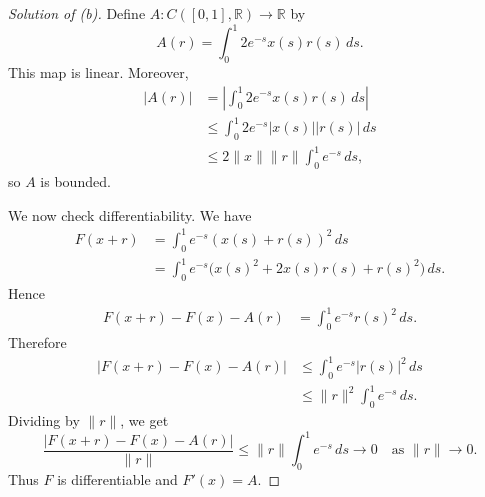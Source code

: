 \begin{proof}[Solution of (b)]
    Define $A : C([0,1], \mathbb R) \to \mathbb R$ by
    \[
        A(r) = \int_0^1 2e^{-s}x(s)r(s)\, ds.
    \]
    This map is linear. Moreover,
    \begin{align*}
        |A(r)|
        &= \left|\int_0^1 2e^{-s}x(s)r(s)\, ds\right| \\
        &\le \int_0^1 2e^{-s}|x(s)||r(s)|\, ds \\
        &\le 2 \|x\| \|r\| \int_0^1 e^{-s}\, ds,
    \end{align*}
    so $A$ is bounded.

    We now check differentiability. We have
    \begin{align*}
        F(x+r)
        &= \int_0^1 e^{-s}(x(s)+r(s))^2\, ds \\
        &= \int_0^1 e^{-s}\big(x(s)^2 + 2x(s)r(s) + r(s)^2\big)\, ds.
    \end{align*}
    Hence
    \begin{align*}
        F(x+r) - F(x) - A(r)
        &= \int_0^1 e^{-s}r(s)^2\, ds.
    \end{align*}
    Therefore
    \begin{align*}
        |F(x+r) - F(x) - A(r)|
        &\le \int_0^1 e^{-s}|r(s)|^2\, ds \\
        &\le \|r\|^2 \int_0^1 e^{-s}\, ds.
    \end{align*}
    Dividing by $\|r\|$, we get
    \[
        \frac{|F(x+r) - F(x) - A(r)|}{\|r\|}
        \le \|r\| \int_0^1 e^{-s}\, ds \to 0
        \quad \text{as } \|r\| \to 0.
    \]
    Thus $F$ is differentiable and $F'(x) = A$.
\end{proof}

